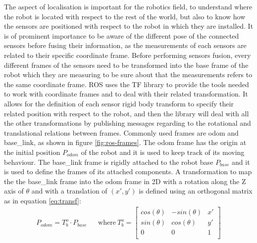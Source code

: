 The aspect of localisation is important for the robotics field, to understand where the robot is located with respect to the rest of the world, but also to know how the sensors are positioned with respect to the robot in which they are installed.
It is of prominent importance to be aware of the different pose of the connected sensors before fusing their information, as the measurements of each sensors are related to their specific coordinate frame.
Before performing sensors fusion, every different frames of the sensors need to be transformed into the base frame of the robot which they are measuring to be sure about that the measurements refers to the same coordinate frame. 
\Gls{ROS} uses the TF\cite{6556373} library to provide the tools needed to work with coordinate frames and to deal with their related transformation.
It allows for the definition of each sensor rigid body transform to specify their related position with respect to the robot, and then the library will deal with all the other transformations by publishing messages regarding to the rotational and translational relations between frames.
Commonly used frames are odom and base\_link, as shown in figure \ref{fig:ros-frames}. The odom frame has the origin at the initial position $P_{odom}$ of the robot and it is used to keep track of its moving behaviour. The base\_link frame is rigidly attached to the robot base $P_{base}$ and it is used to define the frames of its attached components. A transformation to map the the base\_link frame into the odom frame in \Gls{2D} with a rotation along the Z axis of $\theta$ and with a translation of $(x',y')$ is defined using an orthogonal matrix as in equation \ref{eq:transf}:
\begin{align}
P_{odom} = T^o_b \cdot P_{base} && \textrm{where} ~ 
T^o_b = 
\begin{bmatrix}
cos(\theta) & -sin(\theta) & x' \\
sin(\theta) & cos(\theta) & y' \\
0 & 0 & 1 \\
\end{bmatrix} 
\label{eq:transf}
\end{align}


